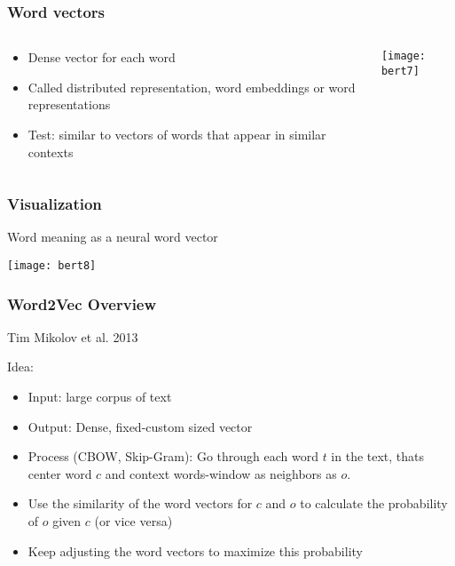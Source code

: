 \begin{frame}[fragile]\frametitle{Word vectors}

\begin{columns}
    \begin{column}[T]{0.5\linewidth}
			\begin{itemize}
			\item Dense vector for each word
			\item Called distributed representation, word embeddings or  word representations 
			\item Test: similar to vectors of words that appear in similar contexts
			\end{itemize}
    \end{column}
    \begin{column}[T]{0.5\linewidth}
			\begin{center}
			\texttt{[image: bert7]}
			\end{center}		  
    \end{column}
  \end{columns}

\end{frame}

\begin{frame}[fragile]\frametitle{Visualization}
Word meaning as a neural word vector
	  
\begin{center}
\texttt{[image: bert8]}
\end{center}		  
		


\end{frame}

\begin{frame}[fragile]\frametitle{Word2Vec Overview}
Tim Mikolov et al. 2013

Idea:
\begin{itemize}
\item Input: large corpus of text
\item Output: Dense, fixed-custom sized vector
\item Process (CBOW, Skip-Gram): Go through each word $t$ in the text, thats center word $c$ and context words-window as neighbors as $o$.
\item Use the similarity of the word vectors for $c$ and $o$ to calculate the probability of $o$ given $c$ (or vice versa)
\item Keep adjusting the word vectors to maximize this probability

\end{itemize}


\end{frame}

